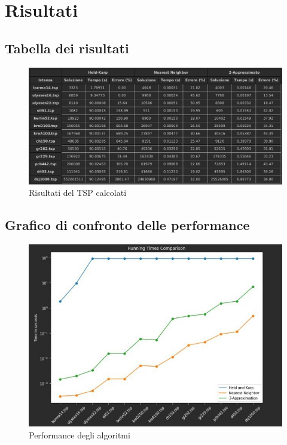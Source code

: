 \section{Risultati}\label{risultati}

\subsection{Tabella dei risultati}
\begin{center}
	\begin{figure}[H]
		\centering
		\hspace{-1cm}\includegraphics[width=17cm]{Img/table_results.jpg}
		\caption{Risultati del TSP calcolati}
	\end{figure}
\end{center}

\subsection{Grafico di confronto delle performance}
\begin{center}
	\begin{figure}[H]
		\centering
		\hspace{-1cm}\includegraphics[width=12cm]{Img/time_graph.jpg}
		\caption{Performance degli algoritmi}
	\end{figure}
\end{center}

